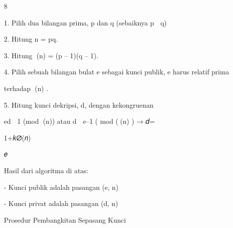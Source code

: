\documentclass{article}
\begin{document}

8

1. Pilih dua bilangan prima, p dan q  (sebaiknya p  q)

2. Hitung n = pq. 

3. Hitung (n) = (p – 1)(q – 1). 

4. Pilih sebuah bilangan bulat e sebagai kunci publik, e harus relatif prima 

terhadap (n) .  

5. Hitung kunci dekripsi, d, dengan kekongruenan



 ed  1 (mod (n)) atau d  e–1 ( mod ((n) ) → 𝑑=

1+𝑘∅(𝑛)

𝑒

Hasil dari algoritma di atas:

 -  Kunci publik adalah pasangan (e, n) 

  - Kunci privat adalah pasangan (d, n)


Prosedur Pembangkitan Sepasang Kunci
\end{document}
